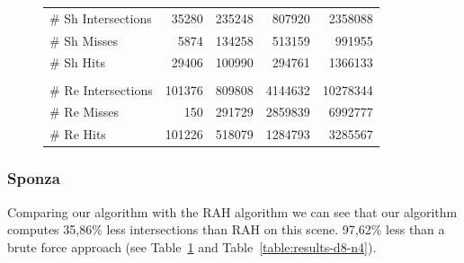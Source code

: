 \begin{figure}[!htb]
\begin{minipage}{0.725\linewidth}
\begin{tabular}[h]{l|rrrr}
            \hline
            \quad \# Sh Intersections   & 35280	    & 235248	& 807920	& 2358088	\\
            \quad \# Sh Misses          & 5874		& 134258	& 513159	& 991955	\\
            \quad \# Sh Hits            & 29406	    & 100990    & 294761	& 1366133	\\
            & & \\
            \quad \# Re Intersections   & 101376	& 809808	& 4144632	& 10278344	\\
            \quad \# Re Misses          & 150		& 291729	& 2859839	& 6992777	\\
            \quad \# Re Hits            & 101226	& 518079	& 1284793	& 3285567	\\            
        \end{tabular}
        \label{table:cornell-d8-n4-results}
    \end{minipage}
\end{figure}

\subsubsection{Sponza}


Comparing our algorithm with the RAH algorithm we can see that our algorithm computes 35,86\% less intersections than RAH on this scene. 97,62\% less than a brute force approach (see Table~\ref{table:cornell-d8-n4-results} and Table~\ref{table:results-d8-n4}).


